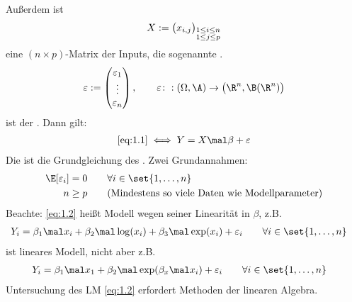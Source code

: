 Außerdem ist
\begin{align*}
	X:=\big(x_{i,j}\big)_{\begin{subarray}{c}
		1\leq i\leq n\\
		1\leq j\leq p
	\end{subarray}}
\end{align*}
eine $(n\times p)$-Matrix der Inputs, die sogenannte .
\begin{align*}
	\varepsilon:=\begin{pmatrix}
		\varepsilon_1\\
		\vdots\\
		\varepsilon_n
	\end{pmatrix},\qquad
	\varepsilon\colon:(\Omega,\A)\to\big(\R^n,\B(\R^n)\big)
\end{align*}
ist der .
Dann gilt:
\begin{align}\label{eq:1.2}%
	\eqref{eq:1.1}
	\iff 
	Y=X\mal\beta+\varepsilon
\end{align}
Die ist die Grundgleichung des .
Zwei Grundannahmen:
\begin{align}\label{eq:1.3}
	\E[\varepsilon_i]&=0\qquad\forall i\in\set{1,\ldots,n}\\
	n&\geq p\qquad\text{(Mindestens so viele Daten wie Modellparameter)}
	\label{eq:1.4}
\end{align}
Beachte: \eqref{eq:1.2} heißt  Modell wegen seiner Linearität in $\beta$, z.B. 
\begin{align*}
	Y_i&=\beta_1\mal x_i+\beta_2\mal\log(x_i)+\beta_3\mal\exp(x_i)+\varepsilon_i
	\qquad\forall i\in\set{1,\ldots,n}
\end{align*}
ist lineares Modell, nicht aber z.B.
\begin{align*}
	Y_i&=\beta_1\mal x_1+\beta_2\mal\exp(\beta_x\mal x_i)+\varepsilon_i
	\qquad\forall i\in\set{1,\ldots,n}
\end{align*}
Untersuchung des LM \eqref{eq:1.2} erfordert Methoden der linearen Algebra.
